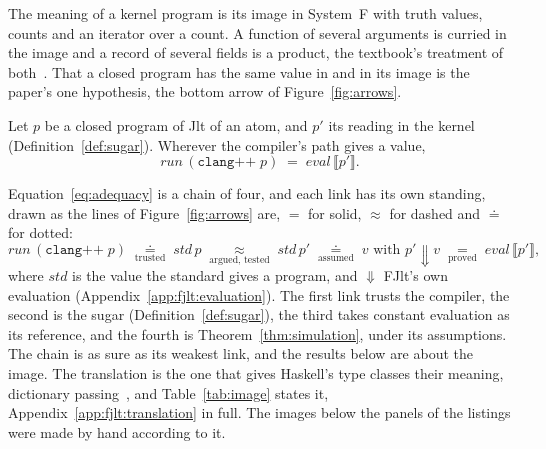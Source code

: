 The meaning of a kernel program is its image in System~F with truth values, counts and an iterator over a count.
A function of several arguments is curried in the image and a record of several fields is a product, the textbook's treatment of both~\cite{pierce2002tapl}.
That a closed program has the same value in \Cpp{} and in its image is the paper's one hypothesis, the bottom arrow of Figure~\ref{fig:arrows}.

\begin{hypothesis}[Adequacy]
\label{hyp:adequacy}
Let $p$ be a closed program of Jlt of an atom, and $p'$ its reading in the kernel (Definition~\ref{def:sugar}).
Wherever the compiler's path gives a value,
\begin{equation}
\label{eq:adequacy}
\mathit{run}\,(\texttt{clang++}\;p) \;=\; \mathit{eval}\,\llbracket p' \rrbracket .
\end{equation}
\end{hypothesis}

\noindent Equation~\eqref{eq:adequacy} is a chain of four, and each link has its own standing, drawn as the lines of Figure~\ref{fig:arrows} are, $=$ for solid, $\approx$ for dashed and $\doteq$ for dotted:
\begin{equation}
\label{eq:adequacy-chain}
\mathit{run}\,(\texttt{clang++}\;p)
\;\underset{\text{trusted}}{\doteq}\; \mathit{std}\,p
\;\underset{\text{argued, tested}}{\approx}\; \mathit{std}\,p'
\;\underset{\text{assumed}}{\doteq}\; v \text{ with } p' \Downarrow v
\;\underset{\text{proved}}{=}\; \mathit{eval}\,\llbracket p' \rrbracket ,
\end{equation}
where $\mathit{std}$ is the value the standard gives a program, and $\Downarrow$ FJlt's own evaluation (Appendix~\ref{app:fjlt:evaluation}).
The first link trusts the compiler, the second is the sugar (Definition~\ref{def:sugar}), the third takes constant evaluation as its reference, and the fourth is Theorem~\ref{thm:simulation}, under its assumptions.
The chain is as sure as its weakest link, and the results below are about the image.
The translation is the one that gives Haskell's type classes their meaning, dictionary passing~\cite{wadler1989adhoc,jones1994qualified}, and Table~\ref{tab:image} states it, Appendix~\ref{app:fjlt:translation} in full.
The images below the panels of the listings were made by hand according to it.

